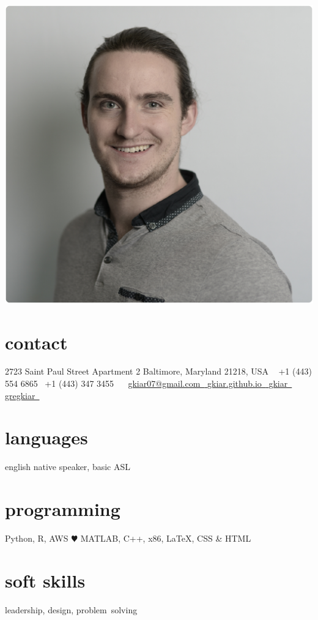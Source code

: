 \documentclass[]{friggeri-cv} %
\begin{document}


\begin{aside} %
\includegraphics[width=\textwidth]{./headshot.pdf}
\section{contact}
2723 Saint Paul Street
Apartment 2
Baltimore, Maryland
21218, USA
~
+1 (443) 554 6865~{\color{green} \faMobilePhone}
+1 (443) 347 3455~{\color{green} \faMobilePhone}
~
\href{mailto:gkiar07@gmail.com}{gkiar07@gmail.com~{\color{red} \faEnvelope}}
\href{http://gkiar.github.io}{gkiar.github.io~{\color{brown} \faGlobe}}
\href{http://github.com/gkiar}{gkiar~{\color{purple} \faGithub}}
\href{https://www.linkedin.com/in/gregkiar}{gregkiar~{\color{blue} \faLinkedin}}
\section{languages}
english native speaker,
basic ASL
\section{programming}
Python, R, AWS {\color{red} $\varheartsuit$}
MATLAB, C++, x86,
LaTeX, CSS \& HTML
\section{soft skills}
leadership, design, problem~solving
\end{aside}
\end{document}
